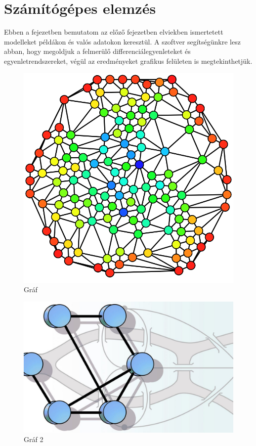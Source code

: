 \chapter{Számítógépes elemzés}
Ebben a fejezetben bemutatom az előző fejezetben elviekben ismertetett modelleket példákon és valós adatokon keresztül. A szoftver segítségünkre lesz abban, hogy megoldjuk a felmerülő differenciálegyenleteket és egyenletrendszereket, végül az eredményeket grafikus felületen is megtekinthetjük.

\begin{figure}[!h]
	\centering
	\includegraphics[scale=0.2]{images/graf1}
	\caption{Gr\'af}
\end{figure}


\begin{figure}[!h]
	\centering
	\includegraphics[scale=0.2]{images/graf2}
	\caption{Gr\'af 2}
\end{figure}


